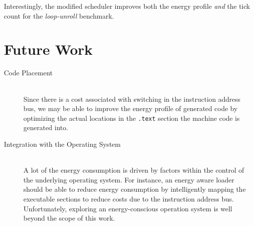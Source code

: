 Interestingly, the modified scheduler improves both the energy profile
\textit{and} the tick count for the \textit{loop-unroll} benchmark.

\section{Future Work}

\begin{description}

\item[Code Placement] \hfill \\ Since there is a cost associated with
  switching in the instruction address bus, we may be able to improve
  the energy profile of generated code by optimizing the actual
  locations in the \texttt{.text} section the machine code is
  generated into.

\item[Integration with the Operating System] \hfill \\ A lot of the
  energy consumption is driven by factors within the control of the
  underlying operating system.  For instance, an energy aware loader
  should be able to reduce energy consumption by intelligently mapping
  the executable sections to reduce costs due to the instruction
  address bus.  Unfortunately, exploring an energy-conscious operation
  system is well beyond the scope of this work.

\end{description}
